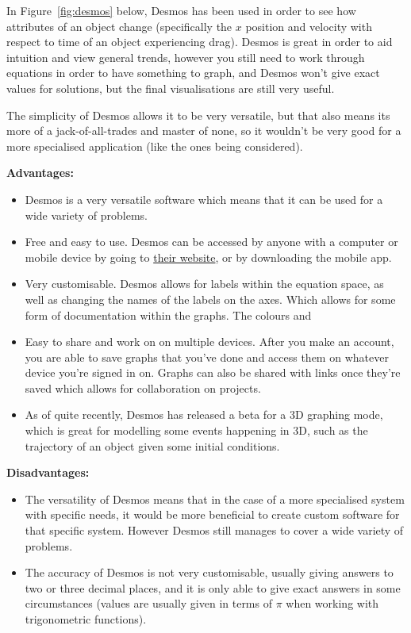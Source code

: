 \documentclass[11pt]{article}
\begin{document}
                In Figure~\ref{fig:desmos} below, Desmos has been used in order to see how attributes of an object change (specifically the $x$ position and velocity with respect to time of an object experiencing drag). Desmos is great in order to aid intuition and view general trends, however you still need to work through equations in order to have something to graph, and Desmos won't give exact values for solutions, but the final visualisations are still very useful. 

                The simplicity of Desmos allows it to be very versatile, but that also means its more of a jack-of-all-trades and master of none, so it wouldn't be very good for a more specialised application (like the ones being considered).

                \newpage
                \textbf{Advantages:}
                \begin{itemize}
                    \item Desmos is a very versatile software which means that it can be used for a wide variety of problems. 
                    \item Free and easy to use. Desmos can be accessed by anyone with a computer or mobile device by going to \href{https://www.desmos.com/calculator}{their website}, or by downloading the mobile app.
                    \item Very customisable. Desmos allows for labels within the equation space, as well as changing the names of the labels on the axes. Which allows for some form of documentation within the graphs. The colours and 
                    \item Easy to share and work on on multiple devices. After you make an account, you are able to save graphs that you've done and access them on whatever device you're signed in on. Graphs can also be shared with links once they're saved which allows for collaboration on projects.
                    \item As of quite recently, Desmos has released a beta for a 3D graphing mode, which is great for modelling some events happening in 3D, such as the trajectory of an object given some initial conditions.
                \end{itemize}

                \textbf{Disadvantages:}
                \begin{itemize}
                    \item The versatility of Desmos means that in the case of a more specialised system with specific needs, it would be more beneficial to create custom software for that specific system. However Desmos still manages to cover a wide variety of problems. 
                    \item The accuracy of Desmos is not very customisable, usually giving answers to two or three decimal places, and it is only able to give exact answers in some circumstances (values are usually given in terms of $\pi$ when working with trigonometric functions).
                \end{itemize}
\end{document}
